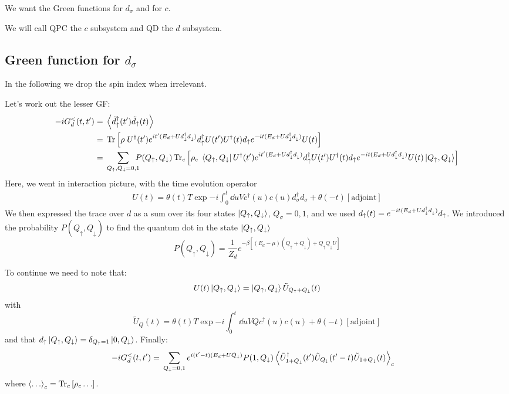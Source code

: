 \documentclass[12pt]{article}
\newcommand\up{\uparrow}
\newcommand\dn{\downarrow}
\newcommand\nodag{{\vphantom{\dagger}}}
\begin{document}
We want the Green functions for $d_\sigma$ and for $c$.

We will call QPC the $c$ subsystem and QD the $d$ subsystem.

\subsection{Green function for $d_\sigma$}

In the following we drop the spin index when irrelevant.

Let's work out the lesser \ac{GF}:
\begin{align}
	-i G^<_d(t, t') ={}& \expval{\tilde d_\up^\dagger(t') \tilde d_\up(t)}
	\\
	={}& \Tr \qty[\rho \; U^\dagger(t') e^{it'(E_d + U d^\dag_\dn d^\nodag_\dn)} d_\up^\dagger U(t') U^\dagger(t) d_\up e^{-it(E_d + U d^\dag_\dn d^\nodag_\dn)} U(t)]
	\\
	={}& \sum_{Q_\up, Q_\dn=0,1} \!\!\!\! P(Q_\up, Q_\dn) \Tr_c \qty[\rho_c \; \bra{Q_\up, Q_\dn} U^\dagger(t') e^{it'(E_d + U d^\dag_\dn d^\nodag_\dn)} d_\up^\dagger U(t') U^\dagger(t) d_\up e^{-it(E_d + U d^\dag_\dn d^\nodag_\dn)} U(t) \ket{Q_\up, Q_\dn}]
\end{align}
Here, we went in interaction picture, with the time evolution operator
\begin{gather}
	U(t) = \theta(t) T \exp{-i \int_0^t \dd{u} V c^\dagger(u) c(u) d_\sigma^\dagger d_\sigma} + \theta(-t) [\text{adjoint}]
\end{gather}
We then expressed the trace over $d$ as a sum over its four states $\ket{Q_\up, Q_\dn}$, $Q_\sigma=0, 1$, and we used $d_\up(t) = e^{-it(E_d + U d^\dag_\dn d^\nodag_\dn)} d_\up$.
We introduced the probability $P(Q_\up, Q_\dn)$ to find the quantum dot in the state  $\ket{Q_\up, Q_\dn}$
\begin{equation}
	P(Q_\up, Q_\dn) = \frac{1}{Z_d} e^{-\beta[(E_d - \mu) (Q_\up + Q_\dn) + Q_\up Q_\dn U]}
\end{equation}

To continue we need to note that:
\begin{equation}
	U(t) \ket{Q_\up,Q_\dn} = \ket{Q_\up,Q_\dn} \tilde U_{Q_\up + Q_\dn}(t)
\end{equation}
with
\begin{equation}
	\tilde U_Q(t) = \theta(t) T \exp{-i \int_0^t \dd{u} V Q c^\dagger(u) c(u)} + \theta(-t) [\text{adjoint}]
\end{equation}
and that $d_\up \ket{Q_\up,Q_\dn} = \delta_{Q_\up=1} \ket{0, Q_\dn}$.
Finally:
\begin{align}
	-i G^<_d(t, t') ={}& \sum_{Q_\dn=0,1} e^{i(t' - t) (E_d + U Q_\dn)} P(1, Q_\dn)
	\expval{ \tilde U_{1+Q_\dn}^\dagger(t') \tilde U_{Q_\dn}(t' - t) \tilde U_{1 + Q_\dn}(t)}_c
\end{align}
where $\expval{\ldots}_c = \Tr_c \qty[\rho_c \ldots ]$.
\end{document}
